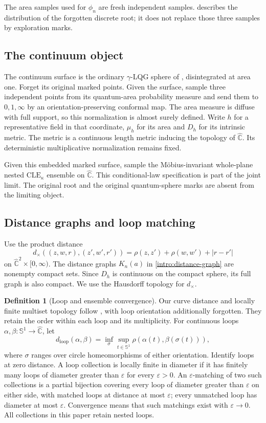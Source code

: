 \documentclass[11pt]{article}
\numberwithin{equation}{section}
\theoremstyle{definition}
\newtheorem{definition}[theorem]{Definition}
\theoremstyle{remark}
\newcommand{\Chat}{\widehat{\mathbb C}}
\newcommand{\1}{\mathbf 1}
\begin{document}
The area samples used for $\phi_n$ are fresh independent samples.
 describes the distribution of the forgotten
discrete root; it does not replace those three samples by exploration
marks.

\subsection{The continuum object}

The continuum surface is the ordinary $\gamma$-LQG sphere of
\citet[Definition~4.21(ii)]{DMSMating}, disintegrated at area one. Forget
its original marked points. Given the surface, sample three independent
points from its quantum-area probability measure and send them to
$0,1,\infty$ by an orientation-preserving conformal map. The area
measure is diffuse with full support, so this normalization is almost
surely defined. Write $h$ for a representative field in that
coordinate, $\mu_h$ for its area and $D_h$ for its intrinsic metric.
The metric is a continuous length metric inducing the topology of
$\Chat$. Its deterministic multiplicative normalization remains
fixed.

Given this embedded marked surface, sample the M\"obius-invariant
whole-plane nested $\mathrm{CLE}_{\kappa}$ ensemble on $\Chat$.
This conditional-law specification is part of the joint limit.
The original root and the original quantum-sphere marks are absent
from the limiting object.

\subsection{Distance graphs and loop matching}

Use the product distance
\[
 d_\times((z,w,r),(z',w',r'))
   =\rho(z,z')+\rho(w,w')+|r-r'|
\]
on $\Chat^2\times[0,\infty)$. The distance graphs
$K_n(a)$ in \eqref{intro:distance-graph} are nonempty compact sets.
Since $D_h$ is continuous on the compact sphere, its full graph is
also compact. We use the Hausdorff topology for $d_\times$.

\begin{definition}[Loop and ensemble convergence]
\label{intro:loop-topology}
Our curve distance and locally finite multiset topology follow
\citet[Section~2.2]{GwynneMillerQianCLE}, with loop orientation additionally
forgotten. They retain the order within each loop and its multiplicity.
For continuous loops $\alpha,\beta:\mathbb S^1\to\Chat$, let
\[
 d_{\mathrm{loop}}(\alpha,\beta)
 =\inf_{\sigma}\sup_{t\in\mathbb S^1}
       \rho(\alpha(t),\beta(\sigma(t))),
\]
where $\sigma$ ranges over circle homeomorphisms of either orientation.
Identify loops at zero distance. A loop collection is locally finite
in diameter if it has finitely many loops of diameter greater than
$\varepsilon$ for every $\varepsilon>0$.
An $\varepsilon$-matching of two such collections is a partial
bijection covering every loop of diameter greater than $\varepsilon$
on either side, with matched loops at distance at most $\varepsilon$;
every unmatched loop has diameter at most $\varepsilon$.
Convergence means that such matchings exist with
$\varepsilon\to0$. All collections in this paper retain nested loops.
\end{definition}
\end{document}
